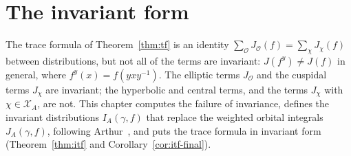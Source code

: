 %
%

\providecommand{\GA}{\overline{G(\A)}}
\providecommand{\GS}{\overline{G(\Q_S)}}
\providecommand{\AS}{\overline{A(\Q_S)}}
\providecommand{\KS}{\overline{K_S}}

\chapter{The invariant form}\label{sec:invariant}

The trace formula of Theorem~\ref{thm:tf} is an identity $\sum_{\mathcal O}
J_{\mathcal O}(f)=\sum_\chi J_\chi(f)$ between distributions, but not all
of the terms are invariant: $J(f^y)\ne J(f)$ in general, where
$f^y(x)=f(yxy^{-1})$. The elliptic terms $J_{\mathcal O}$ and the cuspidal
terms $J_\chi$ are invariant; the hyperbolic and central terms, and the
terms $J_\chi$ with $\chi\in\mathcal X_A$, are not. This chapter computes
the failure of invariance, defines the invariant distributions
$I_A(\gamma,f)$ that replace the weighted orbital integrals
$J_A(\gamma,f)$, following Arthur~\cite{Ar81,Ar88b,Ar88c}, and puts the trace
formula in invariant form (Theorem~\ref{thm:itf} and
Corollary~\ref{cor:itf-final}).

